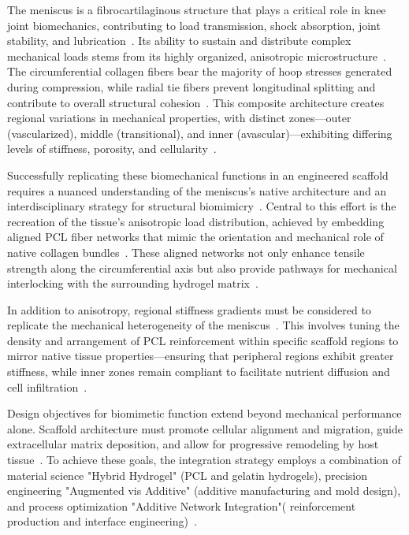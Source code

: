 The meniscus is a fibrocartilaginous structure that plays a critical role in knee joint biomechanics, contributing to load transmission, shock absorption, joint stability, and lubrication~\cite{morejon2020compressiveproperties}. Its ability to sustain and distribute complex mechanical loads stems from its highly organized, anisotropic microstructure~\cite{abdelgaied2015comparisonbiomechanical}. The circumferential collagen fibers bear the majority of hoop stresses generated during compression, while radial tie fibers prevent longitudinal splitting and contribute to overall structural cohesion~\cite{morejon2020compressiveproperties}. This composite architecture creates regional variations in mechanical properties, with distinct zones—outer (vascularized), middle (transitional), and inner (avascular)—exhibiting differing levels of stiffness, porosity, and cellularity~\cite{abdelgaied2015comparisonbiomechanical}.

Successfully replicating these biomechanical functions in an engineered scaffold requires a nuanced understanding of the meniscus's native architecture and an interdisciplinary strategy for structural biomimicry~\cite{morejon2020compressiveproperties}. Central to this effort is the recreation of the tissue's anisotropic load distribution, achieved by embedding aligned PCL fiber networks that mimic the orientation and mechanical role of native collagen bundles~\cite{elkommos2025hybridhydrogels}. These aligned networks not only enhance tensile strength along the circumferential axis but also provide pathways for mechanical interlocking with the surrounding hydrogel matrix~\cite{elkommos2024developmentimproved,elkommos2025hybridhydrogels}.

In addition to anisotropy, regional stiffness gradients must be considered to replicate the mechanical heterogeneity of the meniscus~\cite{morejon2020compressiveproperties}. This involves tuning the density and arrangement of PCL reinforcement within specific scaffold regions to mirror native tissue properties—ensuring that peripheral regions exhibit greater stiffness, while inner zones remain compliant to facilitate nutrient diffusion and cell infiltration~\cite{elkommos2025hybridhydrogels}.

Design objectives for biomimetic function extend beyond mechanical performance alone. Scaffold architecture must promote cellular alignment and migration, guide extracellular matrix deposition, and allow for progressive remodeling by host tissue~\cite{ahmed2015hydrogelpreparation}. To achieve these goals, the integration strategy employs a combination of material science "Hybrid Hydrogel" (PCL and gelatin hydrogels), precision engineering "Augmented vis Additive" (additive manufacturing and mold design), and process optimization "Additive Network Integration"( reinforcement production and interface engineering)~\cite{elkommos2024developmentimproved,elkommos2025hybridhydrogels}.

